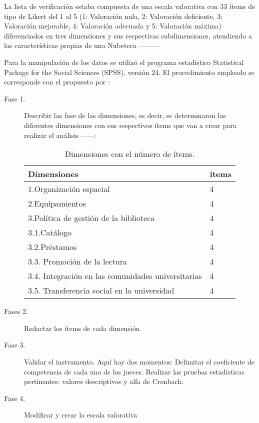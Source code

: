 \documentclass[spanish]{textolivre}
\begin{document}
La lista de verificación estaba compuesta de una escala valorativa con 33 ítems de tipo de Likert del 1 al 5 (1: Valoración nula, 2: Valoración deficiente, 3: Valoración mejorable, 4: Valoración adecuada y 5: Valoración máxima) diferenciados en tres dimensiones y sus respectivas subdimensiones, atendiendo a las características propias de una Nubeteca ———

Para la manipulación de los datos se utilizó el programa estadístico Statistical Package for the Social Sciences (SPSS), versión 24. El procedimiento empleado se corresponde con el propuesto por \textcite{agreda_diseno_2016}:

\begin{description}
    \item[Fase 1.] Describir las fase de las dimensiones, es decir, se determinaron las diferentes dimensiones con sus respectivos ítems que van a crear para realizar el análisis ——:
\begin{table}[h]
\centering
\begin{threeparttable}
\caption{Dimensiones con el número de ítems.}
\label{tbl4}
\centering
\begin{tabular}{ll}
\toprule
Dimensiones & ítems \\ 
\midrule
1.Organización espacial & 4 \\
2.Equipamientos & 4 \\
3.Política de gestión de la biblioteca & 4 \\
3.1.Catálogo & 4 \\
3.2.Préstamos & 4 \\
3.3. Promoción de la lectura & 4 \\
3.4. Integración en las comunidades universitarias & 4 \\
3.5. Transferencia social en la universidad & 4 \\
\bottomrule
\end{tabular}
\end{threeparttable}
\end{table}

    \item[Fases 2.] Redactar los ítems de cada dimensión
    \item[Fase 3.] Validar el instrumento. Aquí hay dos momentos:
        \subitem Delimitar el coeficiente de competencia de cada uno de los jueces. 
        \subitem Realizar las pruebas estadísticas pertinentes: valores descriptivos y  alfa de Cronbach.
    \item[Fase 4.] Modificar y crear la escala valorativa
\end{description}
\end{document}
